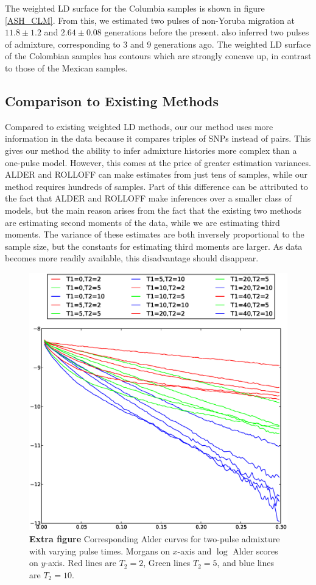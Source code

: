 \documentclass[10pt]{article}
\begin{document}
The weighted LD surface for the Columbia samples is shown in figure
\ref{ASH_CLM}. From this, we estimated two pulses of non-Yoruba migration at
$11.8\pm 1.2$ and $2.64\pm0.08$ generations before the present.
\cite{gravel2013reconstructing} also inferred two pulses of admixture,
corresponding to 3 and 9 generations ago. The weighted LD surface of the
Colombian samples has contours which are strongly concave up, in contrast to
those of the Mexican samples. \subsection{Comparison to Existing Methods}
Compared to existing weighted LD methods, our our method uses more information
in the data because it compares triples of SNPs instead of pairs. This gives our
method the ability to infer admixture histories more complex than a one-pulse
model. However, this comes at the price of greater estimation variances. ALDER
and ROLLOFF can make estimates from just tens of samples, while our method
requires hundreds of samples. Part of this difference can be attributed to the
fact that ALDER and ROLLOFF make inferences over a smaller class of models, but
the main reason arises from the fact that the existing two methods are
estimating second moments of the data, while we are estimating third moments.
The variance of these estimates are both inversely proportional to the sample
size, but the constants for estimating third moments are larger. As data becomes
more readily available, this disadvantage should disappear.



\begin{figure}
	\includegraphics[scale=.6]{alder_Ts.eps}
	\caption{
		{\bf Extra figure}
		Corresponding Alder curves for two-pulse admixture with varying pulse times.
		Morgans on $x$-axis and $\log$ Alder scores on $y$-axis. Red lines are
		$T_2=2$, Green lines $T_2=5$, and blue lines are $T_2=10$.
	}
\end{figure}
\end{document}
